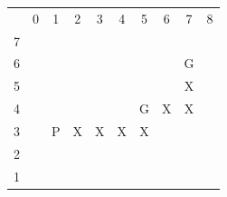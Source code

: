 \documentclass[11pt]{exam}
\begin{document}
\begin{table}[H]
	\centering
	\begin{tabular}{cccccccccc}
		&
		0 &
		1 &
		2 &
		3 &
		4 &
		5 &
		6 &
		7 &
		8 \\ \cline{2-9}
		\multicolumn{1}{c|}{7} &
		\multicolumn{1}{c|}{\cellcolor[HTML]{000000}} &
		\multicolumn{1}{c|}{\cellcolor[HTML]{000000}} &
		\multicolumn{1}{c|}{\cellcolor[HTML]{000000}} &
		\multicolumn{1}{c|}{\cellcolor[HTML]{000000}} &
		\multicolumn{1}{c|}{\cellcolor[HTML]{000000}} &
		\multicolumn{1}{c|}{\cellcolor[HTML]{000000}} &
		\multicolumn{1}{c|}{\cellcolor[HTML]{000000}} &
		\multicolumn{1}{c|}{\cellcolor[HTML]{000000}} &
		\cellcolor[HTML]{000000} \\ \cline{2-9}
		\multicolumn{1}{c|}{6} &
		\multicolumn{1}{c|}{\cellcolor[HTML]{000000}} &
		\multicolumn{1}{c|}{} &
		\multicolumn{1}{c|}{} &
		\multicolumn{1}{c|}{} &
		\multicolumn{1}{c|}{} &
		\multicolumn{1}{c|}{} &
		\multicolumn{1}{c|}{} &
		\multicolumn{1}{c|}{G} &
		\cellcolor[HTML]{000000} \\ \cline{2-9}
		\multicolumn{1}{c|}{5} &
		\multicolumn{1}{c|}{\cellcolor[HTML]{000000}} &
		\multicolumn{1}{c|}{} &
		\multicolumn{1}{c|}{} &
		\multicolumn{1}{c|}{} &
		\multicolumn{1}{c|}{} &
		\multicolumn{1}{c|}{} &
		\multicolumn{1}{c|}{} &
		\multicolumn{1}{c|}{X} &
		\cellcolor[HTML]{000000} \\ \cline{2-9}
		\multicolumn{1}{c|}{4} &
		\multicolumn{1}{c|}{\cellcolor[HTML]{000000}} &
		\multicolumn{1}{c|}{} &
		\multicolumn{1}{c|}{} &
		\multicolumn{1}{c|}{} &
		\multicolumn{1}{c|}{} &
		\multicolumn{1}{c|}{G} &
		\multicolumn{1}{c|}{X} &
		\multicolumn{1}{c|}{X} &
		\cellcolor[HTML]{000000} \\ \cline{2-9}
		\multicolumn{1}{c|}{3} &
		\multicolumn{1}{c|}{\cellcolor[HTML]{000000}} &
		\multicolumn{1}{c|}{P} &
		\multicolumn{1}{c|}{X} &
		\multicolumn{1}{c|}{X} &
		\multicolumn{1}{c|}{X} &
		\multicolumn{1}{c|}{X} &
		\multicolumn{1}{c|}{} &
		\multicolumn{1}{c|}{} &
		\cellcolor[HTML]{000000} \\ \cline{2-9}
		\multicolumn{1}{c|}{2} &
		\multicolumn{1}{c|}{\cellcolor[HTML]{000000}} &
		\multicolumn{1}{c|}{} &
		\multicolumn{1}{c|}{} &
		\multicolumn{1}{c|}{} &
		\multicolumn{1}{c|}{} &
		\multicolumn{1}{c|}{} &
		\multicolumn{1}{c|}{} &
		\multicolumn{1}{c|}{} &
		\cellcolor[HTML]{000000} \\ \cline{2-9}
		\multicolumn{1}{c|}{1} &
		\multicolumn{1}{c|}{\cellcolor[HTML]{000000}} &
		\multicolumn{1}{c|}{} &
		\multicolumn{1}{c|}{} &

\end{tabular}
\end{table}
\end{document}
